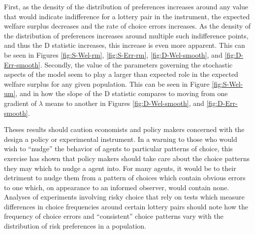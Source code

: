 \documentclass[../main.tex]{subfiles}
\begin{document}
First, as the density of the distribution of preferences increases around any value that would indicate indifference for a lottery pair in the instrument, the expected welfare surplus decreases and the rate of choice errors increases.
As the density of the distribution of preferences increases around multiple such indifference points, and thus the D statistic increases, this increase is even more apparent.
This can be seen in Figures \ref{fig:S-Wel-rm}, \ref{fig:S-Err-rm}, \ref{fig:D-Wel-smooth}, and \ref{fig:D-Err-smooth}.
Secondly, the value of the parameters governing the stochastic aspects of the model seem to play a larger than expected role in the expected welfare surplus for any given population.
This can be seen in Figure \ref{fig:S-Wel-um}, and in how the slope of the D statistic compares to moving from one gradient of $\lambda$ means to another in Figures \ref{fig:D-Wel-smooth}, and \ref{fig:D-Err-smooth}.

Theses results should caution economists and policy makers concerned with the design a policy or experimental instrument.
In a warning to those who would wish to \enquote{nudge} the behavior of agents to particular patterns of choice, this exercise has shown that policy makers should take care about the choice patterns they may which to nudge a agent into.
For many agents, it would be to their detriment to nudge them from a pattern of choices which contain obvious errors to one which, on appearance to an informed observer, would contain none.
Analyses of experiments involving risky choice that rely on tests which measure differences in choice frequencies around certain lottery pairs should note how the frequency of choice errors and \enquote{consistent} choice patterns vary with the distribution of risk preferences in a population.

\newpage

\onlyinsubfile{
\newpage
\printbibliography[segment=3, heading=subbibliography]
}
\end{document}
